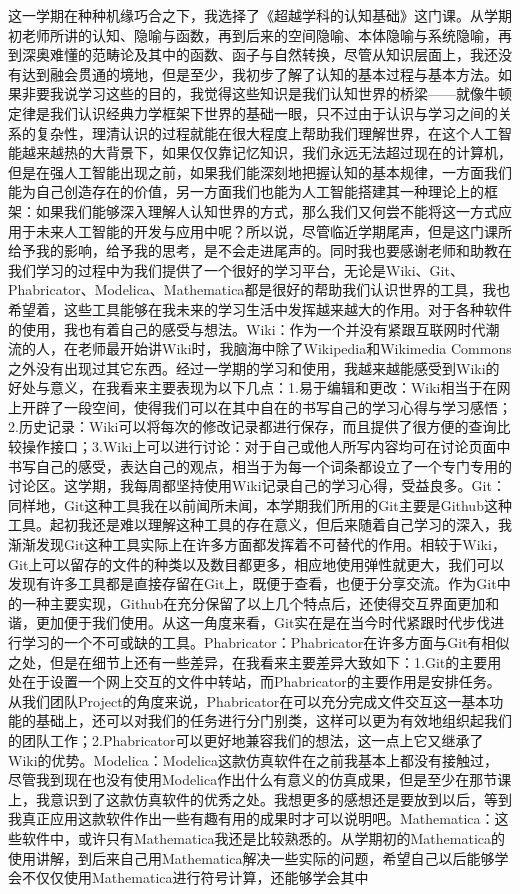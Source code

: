 \documentclass[11pt,fleqn]{book}
\numberwithin{dummy}{section}
\theoremstyle{ocrenumbox}
\theoremstyle{blacknumex}
\theoremstyle{blacknumbox}
\theoremstyle{ocrenum}
\newenvironment{remark}[1]{\par\vspace{10pt}\small %
	\begin{list}{}{
			\leftmargin=35pt %
			\rightmargin=25pt}\item\ignorespaces %
		\makebox[-2.5pt]{\begin{tikzpicture}[overlay]
			\node[draw=ocre!60,line width=1pt,circle,fill=ocre!25,font=\sffamily\bfseries,inner sep=2pt,outer sep=0pt] at (-15pt,0pt){\textcolor{ocre}{#1}};\end{tikzpicture}} %
		\advance\baselineskip -1pt}{\end{list}\vskip5pt} %
\newlength\esp
\begin{document}
\begin{remark}{费}
	这一学期在种种机缘巧合之下，我选择了《超越学科的认知基础》这门课。从学期初老师所讲的认知、隐喻与函数，再到后来的空间隐喻、本体隐喻与系统隐喻，再到深奥难懂的范畴论及其中的函数、函子与自然转换，尽管从知识层面上，我还没有达到融会贯通的境地，但是至少，我初步了解了认知的基本过程与基本方法。如果非要我说学习这些的目的，我觉得这些知识是我们认知世界的桥梁——就像牛顿定律是我们认识经典力学框架下世界的基础一眼，只不过由于认识与学习之间的关系的复杂性，理清认识的过程就能在很大程度上帮助我们理解世界，在这个人工智能越来越热的大背景下，如果仅仅靠记忆知识，我们永远无法超过现在的计算机，但是在强人工智能出现之前，如果我们能深刻地把握认知的基本规律，一方面我们能为自己创造存在的价值，另一方面我们也能为人工智能搭建其一种理论上的框架：如果我们能够深入理解人认知世界的方式，那么我们又何尝不能将这一方式应用于未来人工智能的开发与应用中呢？所以说，尽管临近学期尾声，但是这门课所给予我的影响，给予我的思考，是不会走进尾声的。同时我也要感谢老师和助教在我们学习的过程中为我们提供了一个很好的学习平台，无论是Wiki、Git、Phabricator、Modelica、Mathematica都是很好的帮助我们认识世界的工具，我也希望着，这些工具能够在我未来的学习生活中发挥越来越大的作用。对于各种软件的使用，我也有着自己的感受与想法。Wiki：作为一个并没有紧跟互联网时代潮流的人，在老师最开始讲Wiki时，我脑海中除了Wikipedia和Wikimedia Commons之外没有出现过其它东西。经过一学期的学习和使用，我越来越能感受到Wiki的好处与意义，在我看来主要表现为以下几点：1.易于编辑和更改：Wiki相当于在网上开辟了一段空间，使得我们可以在其中自在的书写自己的学习心得与学习感悟；2.历史记录：Wiki可以将每次的修改记录都进行保存，而且提供了很方便的查询比较操作接口；3.Wiki上可以进行讨论：对于自己或他人所写内容均可在讨论页面中书写自己的感受，表达自己的观点，相当于为每一个词条都设立了一个专门专用的讨论区。这学期，我每周都坚持使用Wiki记录自己的学习心得，受益良多。Git：同样地，Git这种工具我在以前闻所未闻，本学期我们所用的Git主要是Github这种工具。起初我还是难以理解这种工具的存在意义，但后来随着自己学习的深入，我渐渐发现Git这种工具实际上在许多方面都发挥着不可替代的作用。相较于Wiki，Git上可以留存的文件的种类以及数目都更多，相应地使用弹性就更大，我们可以发现有许多工具都是直接存留在Git上，既便于查看，也便于分享交流。作为Git中的一种主要实现，Github在充分保留了以上几个特点后，还使得交互界面更加和谐，更加便于我们使用。从这一角度来看，Git实在是在当今时代紧跟时代步伐进行学习的一个不可或缺的工具。Phabricator：Phabricator在许多方面与Git有相似之处，但是在细节上还有一些差异，在我看来主要差异大致如下：1.Git的主要用处在于设置一个网上交互的文件中转站，而Phabricator的主要作用是安排任务。从我们团队Project的角度来说，Phabricator在可以充分完成文件交互这一基本功能的基础上，还可以对我们的任务进行分门别类，这样可以更为有效地组织起我们的团队工作；2.Phabricator可以更好地兼容我们的想法，这一点上它又继承了Wiki的优势。Modelica：Modelica这款仿真软件在之前我基本上都没有接触过，尽管我到现在也没有使用Modelica作出什么有意义的仿真成果，但是至少在那节课上，我意识到了这款仿真软件的优秀之处。我想更多的感想还是要放到以后，等到我真正应用这款软件作出一些有趣有用的成果时才可以说明吧。Mathematica：这些软件中，或许只有Mathematica我还是比较熟悉的。从学期初的Mathematica的使用讲解，到后来自己用Mathematica解决一些实际的问题，希望自己以后能够学会不仅仅使用Mathematica进行符号计算，还能够学会其中
\end{remark}
\end{document}
